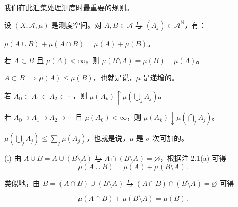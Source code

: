 我们在此汇集处理测度时最重要的规则。

\begin{proposition}

设 $ (X, \mathcal{A}, \mu) $ 是测度空间。对 $ A, B \in \mathcal{A} $ 与 $ (A_j) \in \mathcal{A}^{\mathbb{N}} $，有：

\begin{subitems}
\item

$ \mu(A \cup B) + \mu(A \cap B) = \mu(A) + \mu(B) $。

\item

若 $ A \subset B $ 且 $ \mu(A) < \infty $，则 $ \mu(B \setminus A) = \mu(B) - \mu(A) $。

\item

$ A \subset B \implies \mu(A) \le \mu(B) $，也就是说，$ \mu $ 是递增的。

\item

若 $ A_0 \subset A_1 \subset A_2 \subset \cdots $，则 $ \mu(A_k) \uparrow \mu\left(\bigcup_j A_j\right) $。

\item

若 $ A_0 \supset A_1 \supset A_2 \supset \cdots $ 且 $ \mu(A_0) < \infty $，则 $ \mu(A_k) \downarrow \mu\left(\bigcap_j A_j\right) $。

\item

$ \mu\left(\bigcup_j A_j\right) \le \sum_j \mu(A_j) $，也就是说，$ \mu $ 是 $ \sigma $-次可加的。

\proofhead
(i) 由 $ A \cup B = A \cup (B \setminus A) $ 与 $ A \cap (B \setminus A) = \varnothing $，根据注 2.1(a) 可得
\begin{equation}
\mu(A \cup B) = \mu(A) + \mu(B \setminus A)\,.\tag{2.3}
\end{equation}

类似地，由 $ B = (A \cap B) \cup (B \setminus A) $ 与 $ (A \cap B) \cap (B \setminus A) = \varnothing $ 可得

\begin{equation}
\mu(A \cap B) + \mu(B \setminus A) = \mu(B)\,.\tag{2.4}
\end{equation}


\end{subitems}
\end{proposition}
